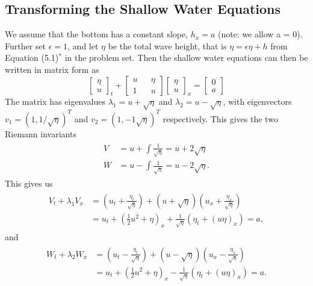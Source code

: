 \documentclass[12pt]{article}
\begin{document}
\subsection{Transforming the Shallow Water Equations}
We assume that the bottom has a constant slope, $h_x = a$ (note: we allow a = 0). Further set $\epsilon =1$, and let $\eta$ be the total wave height, that is $\eta = \epsilon\eta + h$ from Equation (5.1)$^*$ in the problem set. Then the shallow water equations can then be written in matrix form as
\begin{equation}
\begin{bmatrix}
	\eta \\
	u
\end{bmatrix}_t
+
\begin{bmatrix}
u	&& 	\eta \\
1 	&&	u
\end{bmatrix}
\begin{bmatrix}
\eta\\
u
\end{bmatrix}_x
= 
\begin{bmatrix}
0\\
a
\end{bmatrix}
\end{equation}
The matrix has eigenvalues $\lambda_1 = u + \sqrt{\eta}$ and $\lambda_2 = u - \sqrt{\eta}$, with eigenvectors $v_1 = (1,1/\sqrt{\eta})^T$ and $v_2 = (1, {-}1\sqrt{\eta})^T$ respectively. This gives the two Riemann invariants
\begin{align}
	\begin{aligned}
		V &= u + \int \frac{1}{\sqrt{\eta}} = u + 2\sqrt{\eta}\\
		W &= u - \int \frac{1}{\sqrt{\eta}} = u - 2\sqrt{\eta}.
	\end{aligned}
\end{align}
This gives us
\begin{align}
\begin{aligned}
	\label{eq:shallowWaterRiemannV}
	V_t + \lambda_1V_x &= \left(u_t + \frac{\eta_t}{\sqrt{\eta}}\right) + (u + \sqrt{\eta})\left(u_x + \frac{\eta_x}{\sqrt \eta}\right)\\
	& = u_t + \left(\frac{1}{2}u^2 + \eta\right)_x + \frac{1}{\sqrt \eta}(\eta_t + (u\eta)_x) = a,
\end{aligned}
\end{align}
and
\begin{align}
	\label{eq:shallowWaterRiemannW}
	\begin{aligned}
		W_t + \lambda_2W_x &= \left(u_t - \frac{\eta_t}{\sqrt{\eta}}\right) + (u - \sqrt{\eta})\left(u_x - \frac{\eta_x}{\sqrt \eta}\right)\\
		& = u_t + \left(\frac{1}{2}u^2 + \eta\right)_x - \frac{1}{\sqrt \eta}(\eta_t + (u\eta)_x) = a.
	\end{aligned}
\end{align}
\end{document}
